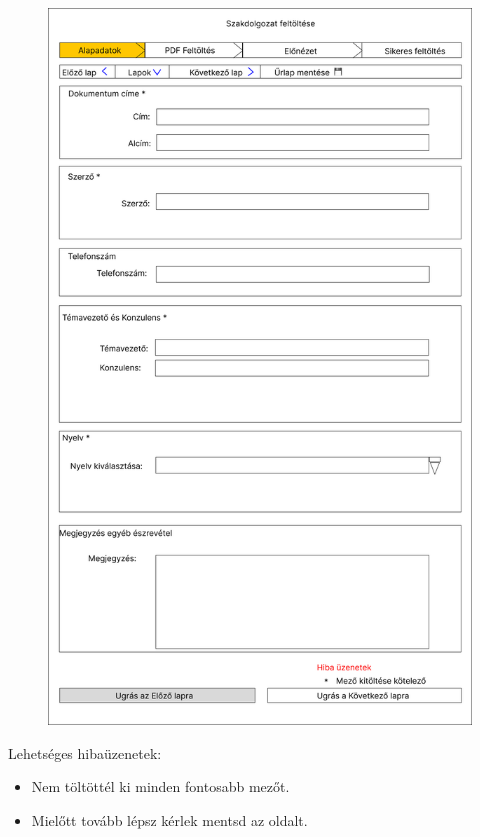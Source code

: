 \documentclass[a4paper,12pt]{article}
\begin{document}
\begin{figure}
	\centering
	\includegraphics[width=\textwidth]{images/Web_pages/Title_Settings.png}
	\caption{}
	\label{fig:Title_Settings}
\end{figure}

Lehetséges hibaüzenetek:
\begin{itemize}
	\item Nem töltöttél ki minden fontosabb mezőt.
	\item Mielőtt tovább lépsz kérlek mentsd az oldalt.
\end{itemize}
\end{document}
